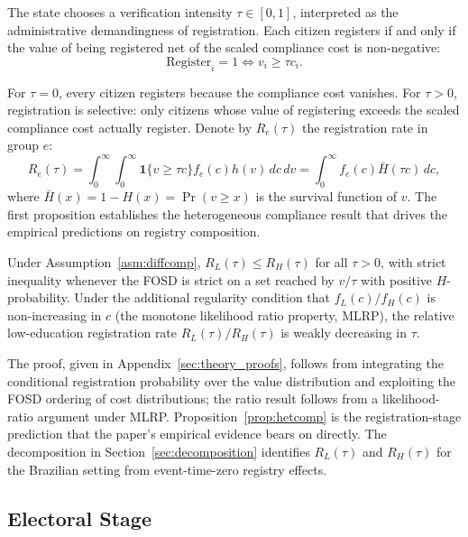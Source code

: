 The state chooses a verification intensity $\tau \in [0, 1]$, interpreted as the administrative demandingness of registration. Each citizen registers if and only if the value of being registered net of the scaled compliance cost is non-negative:
\begin{equation}
\text{Register}_i = 1 \iff v_i \geq \tau c_i.
\label{eq:registration_rule}
\end{equation}

For $\tau = 0$, every citizen registers because the compliance cost vanishes. For $\tau > 0$, registration is selective: only citizens whose value of registering exceeds the scaled compliance cost actually register. Denote by $R_e(\tau)$ the registration rate in group $e$:
\begin{equation}
R_e(\tau) = \int_0^\infty \int_0^\infty \mathbf{1}\{v \geq \tau c\} f_e(c) h(v) \, dc \, dv = \int_0^\infty f_e(c) \bar H(\tau c) \, dc,
\label{eq:registration_rate}
\end{equation}
where $\bar H(x) = 1 - H(x) = \Pr(v \geq x)$ is the survival function of $v$. The first proposition establishes the heterogeneous compliance result that drives the empirical predictions on registry composition.

\begin{proposition}
\label{prop:hetcomp}
Under Assumption~\ref{asm:diffcomp}, $R_L(\tau) \leq R_H(\tau)$ for all $\tau > 0$, with strict inequality whenever the FOSD is strict on a set reached by $v/\tau$ with positive $H$-probability. Under the additional regularity condition that $f_L(c)/f_H(c)$ is non-increasing in $c$ (the monotone likelihood ratio property, MLRP), the relative low-education registration rate $R_L(\tau)/R_H(\tau)$ is weakly decreasing in $\tau$.
\end{proposition}

The proof, given in Appendix~\ref{sec:theory_proofs}, follows from integrating the conditional registration probability over the value distribution and exploiting the FOSD ordering of cost distributions; the ratio result follows from a likelihood-ratio argument under MLRP. Proposition~\ref{prop:hetcomp} is the registration-stage prediction that the paper's empirical evidence bears on directly. The decomposition in Section~\ref{sec:decomposition} identifies $R_L(\tau)$ and $R_H(\tau)$ for the Brazilian setting from event-time-zero registry effects.

\subsection{Electoral Stage}
\label{ssec:electoral}

